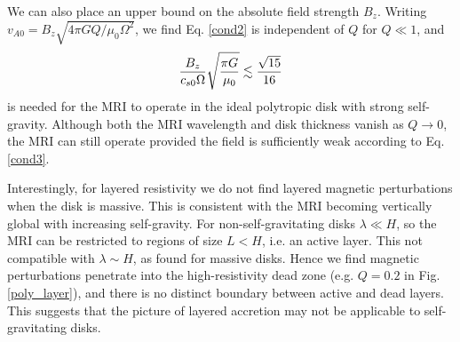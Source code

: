   We can also place an upper bound on the absolute field strength
  $B_z$. Writing $v_{A0} = B_z\sqrt{4\pi G Q/\mu_0\Omega^2}$, we find 
  Eq. \ref{cond2} is independent of $Q$ for $Q\ll1$, and 
  \begin{align}\label{cond3}
    \frac{B_z}{c_{s0}\Omega}\sqrt{\frac{\pi G}{\mu_0}}\lesssim
    \frac{\sqrt{15}}{16}
  \end{align}
  is needed for the MRI to operate in the ideal polytropic disk with strong
  self-gravity. Although both the MRI wavelength and disk thickness
  vanish as $Q\to 0$, the MRI can still operate provided the field is
  sufficiently weak according to Eq. \ref{cond3}.  


 
%
  


Interestingly, for layered resistivity we do not find layered
magnetic perturbations when the disk is massive. This is 
consistent with the MRI becoming vertically global with increasing self-gravity.    
For non-self-gravitating disks $\lambda\ll H$, so the MRI can be
restricted to regions of size $L<H$, i.e. an active layer. This not
compatible with $\lambda \sim H$, as found for massive disks. Hence we
find magnetic perturbations penetrate into the high-resistivity dead
zone (e.g. $Q=0.2$ in Fig. \ref{poly_layer}), and there is no distinct
boundary between active and dead layers. This suggests that the
picture of layered accretion  \citep[e.g.][]{fleming03} may not be applicable 
to self-gravitating disks.  

